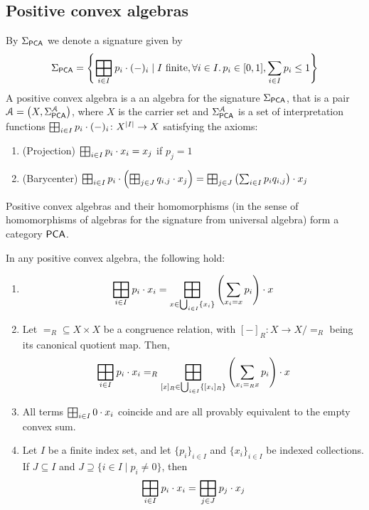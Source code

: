 \subsection{Positive convex algebras}\label{c4:subsec:positive}
By $\Sigma_{{\mathsf{PCA}}}$ we denote a signature given by
$$\sigpca = \left\{\bigboxplus_{i \in I} p_i \cdot (-)_i \mid I \text{ finite}, \forall i \in I \ldotp p_i \in [0,1], \sum_{i \in I} p_i \leq 1\right\} $$
A positive convex algebra is a an algebra for the signature $\Sigma_{{\mathsf{PCA}}}$, that is a pair $\mathcal{A} = \left(X, \Sigma_{{\mathsf{PCA}}}^{\mathcal{A}}\right)$, where $X$ is the carrier set and $\Sigma_{{\mathsf{PCA}}}^{\mathcal{A}}$ is a set of interpretation functions $\bigboxplus_{i \in I} p_i \cdot (-)_i \colon X^{|I|} \to X$ satisfying the axioms:
\begin{enumerate}
    \item (Projection) \(\bigboxplus_{i \in I} p_i \cdot x_i = x_j\) if \(p_j=1\)
    \item (Barycenter) \(\bigboxplus_{i \in I} p_i \cdot \left(\bigboxplus_{j \in J}{q_{i,j}} \cdot {x_j}\right) = \bigboxplus_{j \in J} \left(\sum_{i \in I} p_i q_{i,j} \right) \cdot x_j\)
\end{enumerate}
Positive convex algebras and their homomorphisms (in the sense of homomorphisms of algebras for the signature from universal algebra) form a category ${\mathsf{PCA}}$.
\begin{proposition}\label{c4:prop:properties_of_positive_convex_algebras}
    In any positive convex algebra, the following hold:
    \begin{enumerate}
        \item $${\bigboxplus_{i \in I} p_i \cdot x_i} = {\bigboxplus_{x \in \bigcup_{i \in I} \{x_i\}} \left(\sum_{x_i = x} p_i\right)\cdot x}$$
        \item Let ${=_R} \subseteq {X \times X}$ be a congruence relation, with $[-]_R \colon X \to X/{=_R}$ being its canonical quotient map. Then, 
        $${\bigboxplus_{i \in I} p_i \cdot x_i} =_R {\bigboxplus_{[x]_R \in \bigcup_{i \in I} \left\{[x_i]_R\right\}} \left(\sum_{x_i =_R x} p_i\right)\cdot x}$$
        \item All terms $\bigboxplus_{i \in I } 0 \cdot x_i $ coincide and are all provably equivalent to the empty convex sum.
        \item   Let $I$ be a finite index set, and let $\{p_i\}_{i \in I}$ and $\{x_i\}_{i \in I}$ be indexed collections. If $J \subseteq I$ and $J \supseteq \{i \in I \mid p_i \neq 0\}$, then 
        $$
        \bigboxplus_{i \in I} p_i \cdot x_i = \bigboxplus_{j \in J} p_j \cdot x_j
        $$
    \end{enumerate}
\end{proposition}
